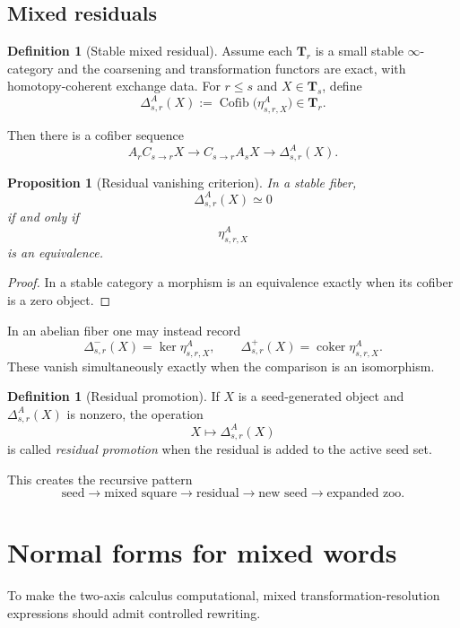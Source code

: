 \documentclass[11pt]{article}
\newtheorem{proposition}[theorem]{Proposition}
\theoremstyle{definition}
\newtheorem{definition}[theorem]{Definition}
\theoremstyle{remark}
\newcommand{\Tcat}{\mathbf T}
\newcommand{\Cofib}{\operatorname{Cofib}}
\begin{document}
\subsection{Mixed residuals}

\begin{definition}[Stable mixed residual]
Assume each $\Tcat_r$ is a small stable $\infty$-category and the coarsening and transformation functors are exact, with homotopy-coherent exchange data. For $r\le s$ and $X\in\Tcat_s$, define
\[
\Delta^A_{s,r}(X)
:=
\Cofib\bigl(\eta^A_{s,r,X}\bigr)
\in\Tcat_r.
\]
\end{definition}

Then there is a cofiber sequence
\[
A_rC_{s\to r}X
\longrightarrow
C_{s\to r}A_sX
\longrightarrow
\Delta^A_{s,r}(X).
\]

\begin{proposition}[Residual vanishing criterion]\label{prop:residual-vanish}
In a stable fiber,
\[
\Delta^A_{s,r}(X)\simeq0
\]
if and only if
\[
\eta^A_{s,r,X}
\]
is an equivalence.
\end{proposition}

\begin{proof}
In a stable category a morphism is an equivalence exactly when its cofiber is a zero object.
\end{proof}

In an abelian fiber one may instead record
\[
\Delta^-_{s,r}(X)=\ker\eta^A_{s,r,X},
\qquad
\Delta^+_{s,r}(X)=\operatorname{coker}\eta^A_{s,r,X}.
\]
These vanish simultaneously exactly when the comparison is an isomorphism.

\begin{definition}[Residual promotion]
If $X$ is a seed-generated object and $\Delta^A_{s,r}(X)$ is nonzero, the operation
\[
X\longmapsto\Delta^A_{s,r}(X)
\]
is called \emph{residual promotion} when the residual is added to the active seed set.
\end{definition}

This creates the recursive pattern
\[
\text{seed}
\to
\text{mixed square}
\to
\text{residual}
\to
\text{new seed}
\to
\text{expanded zoo}.
\]

\section{Normal forms for mixed words}

To make the two-axis calculus computational, mixed transformation-resolution expressions should admit controlled rewriting.
\end{document}
